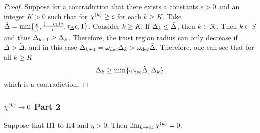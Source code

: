 \begin{proof}
Suppose for a contradiction that there exists a constants $\epsilon > 0$ and an integer $K > 0$ such that for ${\chi^{(k)}} \ge \epsilon$ for each $k \ge K$.
Take $ \tilde \Delta = \min \{\frac{\epsilon}{\beta}, \frac{(1 - \eta_1)c}{\epsilon}, \tau_{\Delta} \epsilon, 1\}$.
Consider $k \ge K$.
If $\Delta_k \le \tilde \Delta$, then $k \in \mathcal K$.
Then $k \in \bar S$ and thus $\Delta_{k+1} \ge \Delta_k$.
Therefore, the trust region radius can only decrease if $\Delta > \tilde \Delta$, and in this case $\Delta_{k+1} = \omega_{\text{dec}}\Delta_k > \omega_{\text{dec}} \tilde \Delta$.
Therefore, one can see that for all $k \ge K$
\begin{align}
\Delta_k \ge \min\{\omega_{\text{dec}} \tilde \Delta, \Delta_k \}
\end{align}
which is a contradiction.
\end{proof}



\subsubsection{${\chi^{(k)}} \to 0$ Part 2}
\begin{theorem}
Suppose that H1 to H4 and $\eta > 0$. Then $\lim_{k\to\infty}{\chi^{(k)}}=0$.
\end{theorem}

